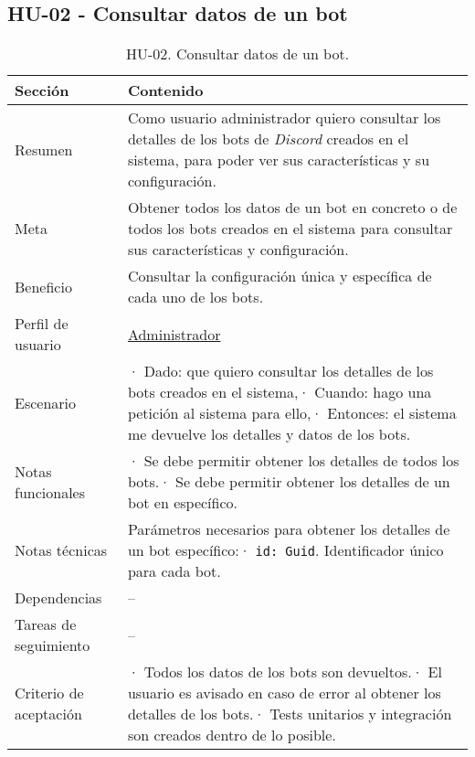 \subsection{HU-02 - Consultar datos de un bot}
\label{sec:hu02}

\begin{table}[H]
    \centering
    \def\arraystretch{1.25}
    \begin{adjustbox}{max width=\textwidth}
    \begin{tabularx}{\textwidth}{|l|L|}
    \hline
        \textbf{Sección} & \textbf{Contenido} \\ \hline
    \hline
        Resumen & Como usuario administrador quiero consultar los detalles de los bots de \textit{Discord} creados en el sistema, para poder ver sus características y su configuración. \\ \hline
        Meta & Obtener todos los datos de un bot en concreto o de todos los bots creados en el sistema para consultar sus características y configuración. \\ \hline
        Beneficio & Consultar la configuración única y específica de cada uno de los bots. \\ \hline
        Perfil de usuario & \hyperref[sec:personaAdmin]{Administrador} \\ \hline
        Escenario & · Dado: que quiero consultar los detalles de los bots creados en el sistema,\linebreak · Cuando: hago una petición al sistema para ello,\linebreak · Entonces: el sistema me devuelve los detalles y datos de los bots. \\ \hline
        Notas funcionales & · Se debe permitir obtener los detalles de todos los bots.\linebreak · Se debe permitir obtener los detalles de un bot en específico. \\ \hline
        Notas técnicas & Parámetros necesarios para obtener los detalles de un bot específico:\linebreak · \verb|id: Guid|. Identificador único para cada bot. \\ \hline
        Dependencias & – \\ \hline
        Tareas de seguimiento & – \\ \hline
        Criterio de aceptación & · Todos los datos de los bots son devueltos.\linebreak · El usuario es avisado en caso de error al obtener los detalles de los bots.\linebreak · Tests unitarios y integración son creados dentro de lo posible. \\ \hline
    \end{tabularx}
    \end{adjustbox}
    \caption{HU-02. Consultar datos de un bot.}
\end{table}

